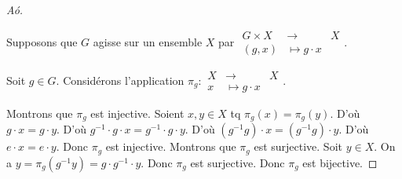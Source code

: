 \documentclass[french]{book}
\theoremstyle{definition}
\begin{document}
\begin{proof}[A\textpi\'o\textdelta\textepsilon\textiota\textxi\textiota]

  \









  Supposons que $G$ agisse sur un ensemble $X$ par $
    \begin{array}{rcl}
    G \times X & \longrightarrow & X \\
    (g,x) & \longmapsto g \cdot x
    \end{array}$.

  Soit $g \in G$. Considérons l'application $\pi_g:
    \begin{array}{rcl}
    X & \longrightarrow & X \\
    x & \longmapsto g \cdot x
    \end{array}$.

  Montrons que $\pi_g$ est injective. Soient $x, y \in X$ tq $\pi_g(x) = \pi_g(y)$. D'où $g \cdot x = g \cdot y$. D'où $g ^{-1}  \cdot g \cdot x = g ^{-1}  \cdot g \cdot y$. D'où $(g ^{-1}  g ) \cdot x = (g ^{-1}  g ) \cdot y$. D'où $e \cdot x = e \cdot y$. Donc $\pi_g$ est injective. Montrons que $\pi_g$ est surjective. Soit $y \in X$. On a $y = \pi_g(g ^{-1}  y) = g \cdot g ^{-1}  \cdot y$. Donc $\pi_g$ est surjective. Donc $\pi_g$ est bijective.


\end{proof}
\end{document}
